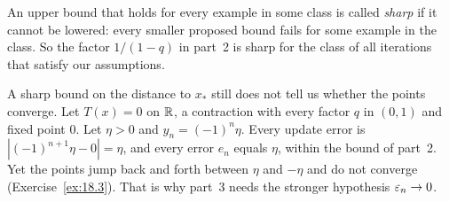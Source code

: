An upper bound that holds for every example in some class is called \emph{sharp} if it cannot be lowered: every smaller proposed bound fails for some example in the class. So the factor $1/(1-q)$ in part~2 is sharp for the class of all iterations that satisfy our assumptions.

A sharp bound on the distance to $x_*$ still does not tell us whether the points converge. Let $T(x)=0$ on $\mathbb R$, a contraction with every factor $q$ in $(0,1)$ and fixed point $0$. Let $\eta>0$ and $y_n=(-1)^n\eta$. Every update error is $|(-1)^{n+1}\eta-0|=\eta$, and every error $e_n$ equals $\eta$, within the bound of part~2. Yet the points jump back and forth between $\eta$ and $-\eta$ and do not converge (Exercise~\ref{ex:18.3}). That is why part~3 needs the stronger hypothesis $\varepsilon_n\to0$.
